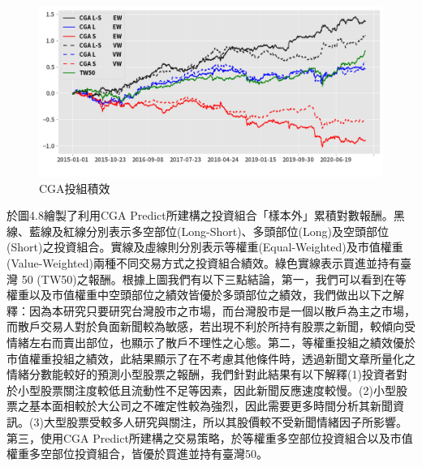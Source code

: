 \begin{figure}[htbp]
\centering
\includegraphics[width=1.1\textwidth]{images/CGA all.png}
\caption{CGA投組積效}
\end{figure}
於圖4.8繪製了利用CGA Predict所建構之投資組合「樣本外」累積對數報酬。黑線、藍線及紅線分別表示多空部位(Long-Short)、多頭部位(Long)及空頭部位(Short)之投資組合。實線及虛線則分別表示等權重(Equal-Weighted)及市值權重(Value-Weighted)兩種不同交易方式之投資組合績效。綠色實線表示買進並持有臺灣 50 (TW50)之報酬。根據上圖我們有以下三點結論，第一，我們可以看到在等權重以及市值權重中空頭部位之績效皆優於多頭部位之績效，我們做出以下之解釋：因為本研究只要研究台灣股市之市場，而台灣股市是一個以散戶為主之市場，而散戶交易人對於負面新聞較為敏感，若出現不利於所持有股票之新聞，較傾向受情緒左右而賣出部位，也顯示了散戶不理性之心態。第二，等權重投組之績效優於市值權重投組之績效，此結果顯示了在不考慮其他條件時，透過新聞文章所量化之情緒分數能較好的預測小型股票之報酬，我們針對此結果有以下解釋(1)投資者對於小型股票關注度較低且流動性不足等因素，因此新聞反應速度較慢。(2)小型股票之基本面相較於大公司之不確定性較為強烈，因此需要更多時間分析其新聞資訊。(3)大型股票受較多人研究與關注，所以其股價較不受新聞情緒因子所影響。第三，使用CGA Predict所建構之交易策略，於等權重多空部位投資組合以及市值權重多空部位投資組合，皆優於買進並持有臺灣50。

